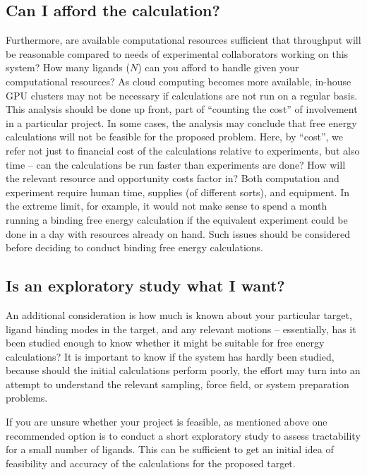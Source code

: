 \documentclass[9pt,bestpractices]{livecoms}
\begin{document}
\subsection{Can I afford the calculation?}
\label{subsec:affordability}
Furthermore, are available computational resources sufficient that throughput will be
reasonable compared to needs of experimental collaborators working on
this system? How many ligands ($N$) can you afford to handle given
your computational resources? As cloud computing becomes more available, in-house GPU clusters may not be necessary if calculations are not run on a regular basis.
This analysis should be done up front, part of ``counting the cost''
of involvement in a particular project. In some cases, the analysis may conclude that free energy calculations will not be feasible for the proposed problem.
Here, by ``cost'', we refer not just to financial cost of the calculations relative to experiments, but also time -- can the calculations be run faster than experiments are done? How will the relevant resource and opportunity costs factor in? Both computation and experiment require human time, supplies (of different sorts), and equipment. In the extreme limit, for example, it would not make sense to spend a month running a binding free energy calculation if the equivalent experiment could be done in a day with resources already on hand. Such issues should be considered before deciding to conduct binding free energy calculations.
%
\subsection{Is an exploratory study what I want?}
\label{subsec:exploration}
An additional consideration is how much is known about your particular
target, ligand binding modes in the target, and any relevant motions
-- essentially, has it been studied enough to know whether it might be
suitable for free energy calculations? It is important to know if the system has hardly been studied, because should the initial calculations perform poorly, the effort may turn into an attempt to understand the relevant sampling, force field, or system preparation problems.

If you are unsure whether your project is feasible, as mentioned above one recommended option is to conduct a short exploratory study to assess tractability for a small
number of ligands. This can be sufficient to get an initial
idea of feasibility and accuracy of the calculations for the
proposed target.
%
\end{document}
